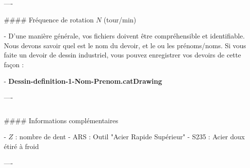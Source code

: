 \documentclass{beamer}
\begin{document}
\begin{frame}[fragile]
\begin{columns}[T]
\begin{column}{.46\textwidth}
\begin{markdown}
----

#### Fréquence de rotation $N$ (tour/min)

- D’une manière générale, vos fichiers doivent être compréhensible et identifiable. Nous devons savoir quel est le nom du devoir, et le ou les prénoms/noms. Si vous faite un devoir de dessin industriel, vous pouvez enregistrer vos devoirs de cette façon :

- \textbf{Dessin-definition-1-Nom-Prenom.catDrawing}

----


\end{markdown}
\end{column}
\end{columns}


\bigskip
{\hrulefill}
\bigskip

\begin{markdown}

#### Informations complémentaires

- $Z$ : nombre de dent
- ARS : Outil "Acier Rapide Supérieur"
- S235 : Acier doux étiré à froid

----

\end{markdown}

\end{frame}
\end{document}
